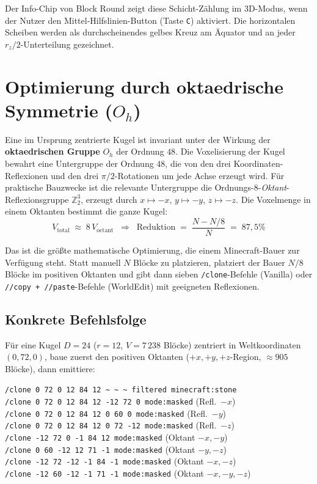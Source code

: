 \documentclass[12pt,a4paper]{scrartcl}
\newcommand{\code}[1]{\texttt{\small #1}}
\newcommand{\acc}[1]{\textcolor{accent}{\textbf{#1}}}
\newcommand{\cmd}[1]{\textcolor{earth}{\texttt{\small #1}}}
\begin{document}
Der Info-Chip von Block Round zeigt diese Schicht-Zählung im 3D-Modus, wenn der Nutzer den Mittel-Hilfslinien-Button (Taste \code{C}) aktiviert. Die horizontalen Scheiben werden als durchscheinendes gelbes Kreuz am Äquator und an jeder $r_z/2$-Unterteilung gezeichnet.

\section{Optimierung durch oktaedrische Symmetrie ($O_h$)}

Eine im Ursprung zentrierte Kugel ist invariant unter der Wirkung der \acc{oktaedrischen Gruppe} $O_h$ der Ordnung $48$. Die Voxelisierung der Kugel bewahrt eine Untergruppe der Ordnung $48$, die von den drei Koordinaten-Reflexionen und den drei $\pi/2$-Rotationen um jede Achse erzeugt wird. Für praktische Bauzwecke ist die relevante Untergruppe die Ordnungs-$8$-\emph{Oktant}-Reflexionsgruppe $\mathbb{Z}_2^3$, erzeugt durch $x \mapsto -x$, $y \mapsto -y$, $z \mapsto -z$. Die Voxelmenge in einem Oktanten bestimmt die ganze Kugel:
\[
V_{\mathrm{total}} \;\approx\; 8\,V_{\mathrm{octant}}\;\;\Longrightarrow\;\;
\text{Reduktion}\;=\;\frac{N - N/8}{N} \;=\; 87{,}5\%
\]

Das ist die größte mathematische Optimierung, die einem Minecraft-Bauer zur Verfügung steht. Statt manuell $N$ Blöcke zu platzieren, platziert der Bauer $N/8$ Blöcke im positiven Oktanten und gibt dann sieben \cmd{/clone}-Befehle (Vanilla) oder \cmd{//copy + //paste}-Befehle (WorldEdit) mit geeigneten Reflexionen.

\subsection{Konkrete Befehlsfolge}
Für eine Kugel $D=24$ ($r=12$, $V = 7\,238$ Blöcke) zentriert in Weltkoordinaten $(0,72,0)$, baue zuerst den positiven Oktanten ($+x, +y, +z$-Region, $\approx 905$ Blöcke), dann emittiere:

\begin{minec}
\cmd{/clone 0 72 0 12 84 12 \textasciitilde\,\textasciitilde\,\textasciitilde\ filtered minecraft:stone}\\
\cmd{/clone 0 72 0 12 84 12 -12 72 0 mode:masked} \quad (Refl.\ \(-x\))\\
\cmd{/clone 0 72 0 12 84 12 0 60 0 mode:masked} \quad\quad (Refl.\ \(-y\))\\
\cmd{/clone 0 72 0 12 84 12 0 72 -12 mode:masked} \quad (Refl.\ \(-z\))\\
\cmd{/clone -12 72 0 -1 84 12 mode:masked} \quad\quad\quad\;\; (Oktant \(-x,-y\))\\
\cmd{/clone 0 60 -12 12 71 -1 mode:masked} \quad\quad\quad (Oktant \(-y,-z\))\\
\cmd{/clone -12 72 -12 -1 84 -1 mode:masked} \quad\;\; (Oktant \(-x,-z\))\\
\cmd{/clone -12 60 -12 -1 71 -1 mode:masked} \quad\;\; (Oktant \(-x,-y,-z\))
\end{minec}
\end{document}
